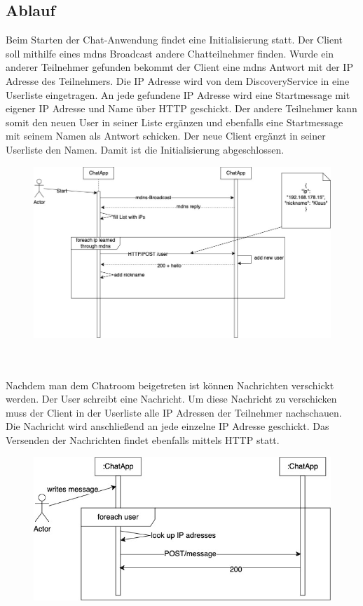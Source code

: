 \subsection{Ablauf}
Beim Starten der Chat-Anwendung findet eine Initialisierung statt. 
Der Client soll mithilfe eines mdns Broadcast andere Chatteilnehmer finden.
Wurde ein anderer Teilnehmer gefunden bekommt der Client eine mdns Antwort mit der IP Adresse des Teilnehmers.
Die IP Adresse wird von dem DiscoveryService in eine Userliste eingetragen. 
An jede gefundene IP Adresse wird eine Startmessage mit eigener IP Adresse und Name über HTTP geschickt. Der andere Teilnehmer kann somit den neuen 
User in seiner Liste ergänzen und ebenfalls eine Startmessage mit seinem Namen als Antwort schicken. Der neue Client ergänzt in seiner Userliste 
den Namen. Damit ist die Initialisierung abgeschlossen. 
\begin{figure}[ht]
    \centering
    \includegraphics[scale=0.4]{Images/Initialisierung_Sequenzdiagramm.jpg}
\end{figure}
\\
\\
Nachdem man dem Chatroom beigetreten ist können Nachrichten verschickt werden. Der User schreibt eine Nachricht. 
Um diese Nachricht zu verschicken muss der Client in der Userliste alle IP Adressen der Teilnehmer nachschauen. Die Nachricht wird anschließend 
an jede einzelne IP Adresse geschickt. Das Versenden der Nachrichten findet ebenfalls mittels HTTP statt.
\begin{figure}[h]
    \centering
    \includegraphics[scale=0.4]{Images/Conversation_Sequenzdiagramm.jpg}
\end{figure}
